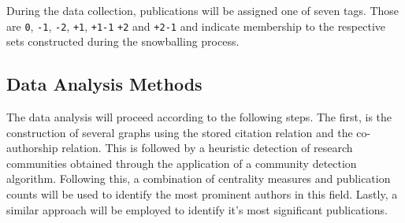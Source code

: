 \documentclass[11pt,a4paper]{book}
\theoremstyle{definition}
\theoremstyle{definition}
\theoremstyle{definition}
\theoremstyle{remark}
\begin{document}
During the data collection, publications will be assigned one of seven tags. Those are \texttt{0}, \texttt{-1}, \texttt{-2}, \texttt{+1}, \texttt{+1-1} \texttt{+2}  and \texttt{+2-1} and indicate membership to the respective sets constructed during the snowballing process.




%    
%     
%     
%     
%     
     


\subsection{Data Analysis Methods}
\label{subsec:data_analysis}
The data analysis will proceed according to the following steps. The first, is the construction of several graphs using the stored citation relation and the co-authorship relation. This is followed by a heuristic detection of research communities obtained through the application of a community detection algorithm. Following this, a combination of centrality measures and publication counts will be used to identify the most prominent authors in this field. Lastly, a similar approach will be employed to identify it's most significant publications.
\end{document}
